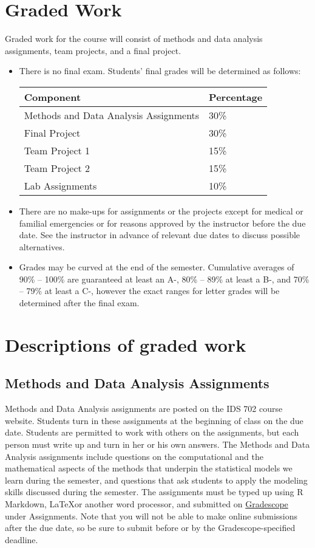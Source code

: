 \documentclass[11pt, a4paper]{article}
\begin{document}
\section{Graded Work} 
Graded work for the course will consist of methods and data analysis assignments, team projects, and a final project. 
\begin{itemize}[label= {\color{darkblue}{\ArrowBoldRightStrobe}}]
	\item There is no final exam. Students' final grades will be determined as follows:
	\begin{table}[h]
		\centering
		\begin{tabular}{ll}
			Component & Percentage \\ \hline
			Methods and Data Analysis Assignments & 30\% \\
			Final Project & 30\% \\ 
			Team Project 1 & 15\% \\
			Team Project 2 & 15\% \\
			Lab Assignments & 10\% \\ \hline 
		\end{tabular}
	\end{table}
	
	\item There are no make-ups for assignments or the projects except for medical or familial emergencies or for reasons approved by the instructor before the due date. See the instructor in advance of relevant due dates to discuss possible alternatives. 
	
	\item Grades may be curved at the end of the semester. Cumulative averages of 90\% -- 100\% are guaranteed at least an A-, 80\% -- 89\% at least a B-, and 70\% -- 79\% at least a C-, however the exact ranges for letter grades will be determined after the final exam. 
\end{itemize}


\section{Descriptions of graded work}
\subsection{Methods and Data Analysis Assignments}
Methods and Data Analysis assignments are posted on the IDS 702 course website. Students turn in these assignments at the beginning of class on the due date. Students are permitted to work with others on the assignments, but each person must write up and turn in her or his own answers. The Methods and Data Analysis assignments include questions on the computational and the mathematical aspects of the methods that underpin the statistical models we learn during the semester, and questions that ask students to apply the modeling skills discussed during the semester. The assignments must be typed up using \textsf{R} Markdown, \LaTeX or another word processor, and submitted on \href{https://www.gradescope.com/courses/57701/assignments}{Gradescope} under Assignments. Note that you will not be able to make online submissions after the due date, so be sure to submit before or by the Gradescope-specified deadline.
\end{document}
